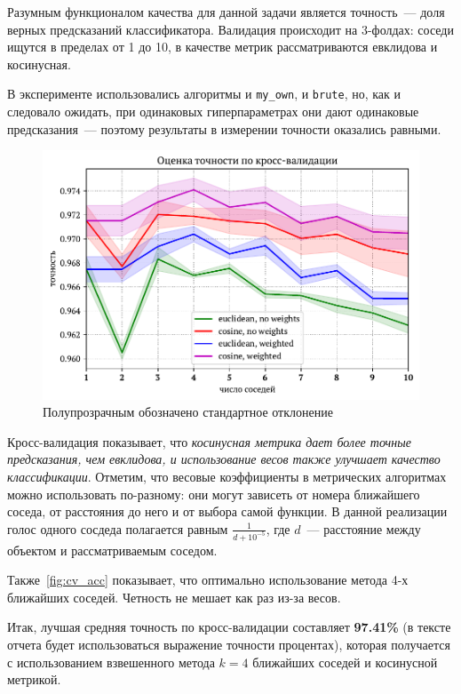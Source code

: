 \documentclass[12pt]{article}
\begin{document}
Разумным функционалом качества для данной задачи является точность~--- доля верных предсказаний классификатора. Валидация происходит на 3-фолдах: соседи ищутся в пределах от 1 до 10, в качестве метрик рассматриваются евклидова и косинусная.

В эксперименте использовались алгоритмы и \verb|my_own|, и \verb|brute|, но, как и следовало ожидать, при одинаковых гиперпараметрах они дают одинаковые предсказания~--- поэтому результаты в измерении точности оказались равными.

\begin{figure}[h]
    \includegraphics{n23_acc}
    \caption{Полупрозрачным обозначено стандартное отклонение}
    \label{fig:cv_acc}
\end{figure}

Кросс-валидация показывает, что \emph{косинусная метрика дает более точные предсказания, чем евклидова, и использование весов также улучшает качество классификации}. Отметим, что весовые коэффициенты в метрических алгоритмах можно использовать по-разному: они могут зависеть от номера ближайшего соседа, от расстояния до него и от выбора самой функции. В данной реализации голос одного сосдеда полагается равным $\frac{1}{d+10^{-5}}$, где $d$~--- расстояние между объектом и рассматриваемым соседом.

Также~\autoref{fig:cv_acc} показывает, что оптимально использование метода 4-х ближайших соседей. Четность не мешает как раз из-за весов.

Итак, лучшая средняя точность по кросс-валидации составляет \textbf{97.41\%} (в тексте отчета будет использоваться выражение точности процентах), которая получается с использованием взвешенного метода $k=4$ ближайших соседей и косинусной метрикой.
\end{document}
